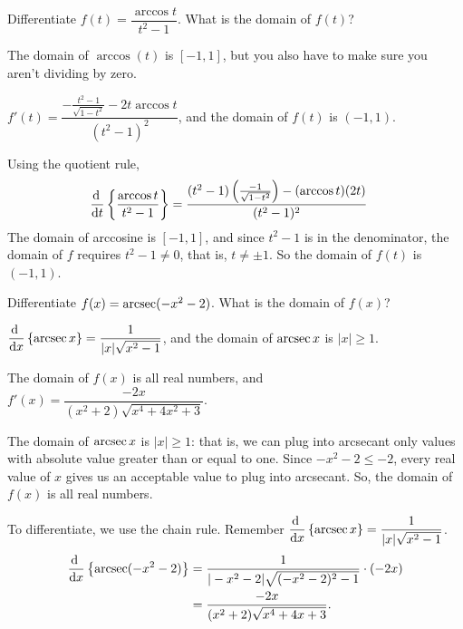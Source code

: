 \begin{Mquestion}
Differentiate $f(t)=\dfrac{\arccos t}{t^2-1}$. What is the domain of $f(t)$?
\end{Mquestion}
\begin{hint}
The domain of $\arccos(t)$ is $[-1,1]$, but you also have to make sure you aren't dividing by zero.
\end{hint}
\begin{answer}
$f'(t)=\dfrac{-\frac{t^2-1}{\sqrt{1-t^2}}-2t\arccos t}{(t^2-1)^2}$, and the domain of $f(t)$ is $(-1,1)$.
\end{answer}
\begin{solution}
Using the quotient rule,
\begin{align*}
\diff{}{t}\left\{\dfrac{\arccos t}{t^2-1}\right\}&=
\frac{(t^2-1)\left(\frac{-1}{\sqrt{1-t^2}}\right)-(\arccos t)(2t)}{(t^2-1)^2}
\end{align*}
The domain of arccosine is $[-1,1]$, and since $t^2-1$ is in the denominator, the domain of $f$ requires $t^2-1 \neq 0$, that is, $t \neq \pm 1$. So the domain of $f(t)$ is $(-1,1)$.
\end{solution}



\begin{question}
Differentiate $f(x)=\mathop{\mathrm{arcsec}}(-x^2-2)$. What is the domain of $f(x)$?
\end{question}
\begin{hint}
$\ds\diff{}{x}\left\{\arcsec x\right\} = \dfrac{1}{|x|\sqrt{x^2-1}}$, and the domain of $\mathop{\mathrm{arcsec}} x$ is $|x|\ge1$.
\end{hint}
\begin{answer}
The domain of $f(x)$ is all real numbers, and
$f'(x)=\dfrac{-2x}{(x^2+2)\sqrt{x^4+4x^2+3}}$.
\end{answer}
\begin{solution}
The domain of $\mathop{\mathrm{arcsec}} x$ is $|x| \geq 1$: that is, we can plug into arcsecant only values with absolute value greater than or equal to one. Since $-x^2-2 \leq -2$, every real value of $x$ gives us an acceptable value to plug into arcsecant. So, the domain of $f(x)$ is all real numbers.

To differentiate, we use the chain rule. Remember $\ds\diff{}{x}\left\{\arcsec x\right\} = \dfrac{1}{|x|\sqrt{x^2-1}}$.
\begin{align*}
\diff{}{x}\left\{\arcsec(-x^2-2)\right\}&=
\dfrac{1}{|-x^2-2|\sqrt{(-x^2-2)^2-1}}\cdot(-2x)\\
&=\dfrac{-2x}{(x^2+2)\sqrt{x^4+4x+3}}.
\end{align*}
\end{solution}





